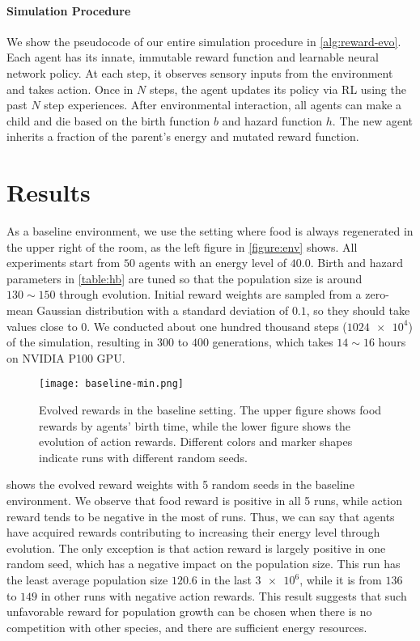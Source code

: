 \paragraph{Simulation Procedure}
We show the pseudocode of our entire simulation procedure in \cref{alg:reward-evo}. Each agent has its innate, immutable reward function and learnable neural network policy. At each step, it observes sensory inputs from the environment and takes action. Once in $N$ steps, the agent updates its policy via RL using the past $N$ step experiences. After environmental interaction, all agents can make a child and die based on the birth function $b$ and hazard function $h$. The new agent inherits a fraction of the parent's energy and mutated reward function.

\section{Results}
As a baseline environment, we use the setting where food is always regenerated in the upper right of the room, as the left figure in \cref{figure:env} shows. All experiments start from $50$ agents with an energy level of $40.0$. Birth and hazard parameters in \cref{table:hb} are tuned so that the population size is around $130\sim 150$ through evolution. Initial reward weights are sampled from a zero-mean Gaussian distribution with a standard deviation of $0.1$, so they should take values close to $0$. We conducted about one hundred thousand steps ($\num{1024e4}$) of the simulation, resulting in $300$ to $400$ generations, which takes $14\sim16$ hours on NVIDIA P100 GPU.

\begin{figure}[t]
  \centering
  \texttt{[image: baseline-min.png]}
  \caption{
    Evolved rewards in the baseline setting.
    The upper figure shows food rewards by agents' birth time, while the lower figure shows the evolution of action rewards.
    Different colors and marker shapes indicate runs with different random seeds.
  }\label{figure:result-baseline}
\end{figure}

 shows the evolved reward weights with 5 random seeds in the baseline environment. We observe that food reward is positive in all 5 runs, while action reward tends to be negative in the most of runs. Thus, we can say that agents have acquired rewards contributing to increasing their energy level through evolution. The only exception is that action reward is largely positive in one random seed, which has a negative impact on the population size. This run has the least average population size $120.6$ in the last $\num{3e6}$, while it is from $136$ to $149$ in other runs with negative action rewards. This result suggests that such unfavorable reward for population growth can be chosen when there is no competition with other species, and there are sufficient energy resources.

